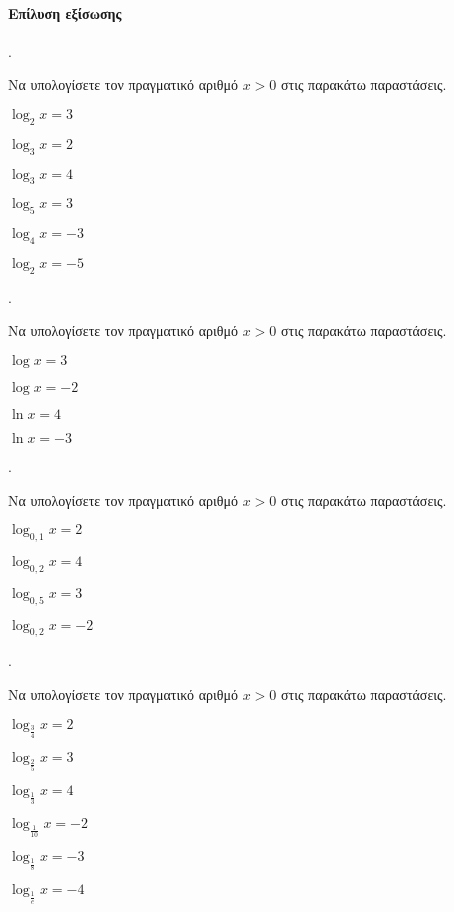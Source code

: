 \documentclass[11pt,a4paper,twocolumn]{article}
\newcounter{askhsh}
\newcommand{\askhsh}{{\large\theaskhsh.}\ \addtocounter{askhsh}{1}}
\begin{document}
\paragraph{Επίλυση εξίσωσης}
\askhsh Να υπολογίσετε τον πραγματικό αριθμό $ x>0 $ στις παρακάτω παραστάσεις.
\begin{multicols}{2}
\begin{alist}
\item $ \log_{2}{x}=3 $
\item $ \log_{3}{x}=2 $
\item $ \log_{3}{x}=4 $
\item $ \log_{5}{x}=3 $
\item $ \log_{4}{x}=-3 $
\item $ \log_{2}{x}=-5 $
\end{alist}
\end{multicols}
\askhsh Να υπολογίσετε τον πραγματικό αριθμό $ x>0 $ στις παρακάτω παραστάσεις.
\begin{multicols}{2}
\begin{alist}
\item $ \log{x}=3 $
\item $ \log{x}=-2 $
\item $ \ln{x}=4 $
\item $ \ln{x}=-3 $
\end{alist}
\end{multicols}
\askhsh Να υπολογίσετε τον πραγματικό αριθμό $ x>0 $ στις παρακάτω παραστάσεις.
\begin{multicols}{2}
\begin{alist}
\item $ \log_{0{,}1}{x}=2 $
\item $ \log_{0{,}2}{x}=4 $
\item $ \log_{0{,}5}{x}=3 $
\item $ \log_{0{,}2}{x}=-2 $
\end{alist}
\end{multicols}
\askhsh Να υπολογίσετε τον πραγματικό αριθμό $ x>0 $ στις παρακάτω παραστάσεις.
\begin{multicols}{2}
\begin{alist}
\item $ \log_{\frac{3}{4}}{x}=2 $
\item $ \log_{\frac{2}{5}}{x}=3 $
\item $ \log_{\frac{1}{3}}{x}=4 $
\item $ \log_{\frac{1}{10}}{x}=-2 $
\item $ \log_{\frac{1}{8}}{x}=-3 $
\item $ \log_{\frac{1}{e}}{x}=-4 $
\end{alist}
\end{multicols}
\end{document}
